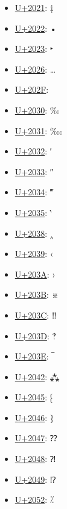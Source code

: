 \begin{itemize}
	\item \href{https://www.compart.com/en/unicode/U+2021}{U+2021}: ‡
	\item \href{https://www.compart.com/en/unicode/U+2022}{U+2022}: •
	\item \href{https://www.compart.com/en/unicode/U+2023}{U+2023}: ‣
	\item \href{https://www.compart.com/en/unicode/U+2026}{U+2026}: …
	\item \href{https://www.compart.com/en/unicode/U+202F}{U+202F}:  
	\item \href{https://www.compart.com/en/unicode/U+2030}{U+2030}: ‰
	\item \href{https://www.compart.com/en/unicode/U+2031}{U+2031}: ‱
	\item \href{https://www.compart.com/en/unicode/U+2032}{U+2032}: ′
	\item \href{https://www.compart.com/en/unicode/U+2033}{U+2033}: ″
	\item \href{https://www.compart.com/en/unicode/U+2034}{U+2034}: ‴
	\item \href{https://www.compart.com/en/unicode/U+2035}{U+2035}: ‵
	\item \href{https://www.compart.com/en/unicode/U+2038}{U+2038}: ‸
	\item \href{https://www.compart.com/en/unicode/U+2039}{U+2039}: ‹
	\item \href{https://www.compart.com/en/unicode/U+203A}{U+203A}: ›
	\item \href{https://www.compart.com/en/unicode/U+203B}{U+203B}: ※
	\item \href{https://www.compart.com/en/unicode/U+203C}{U+203C}: ‼
	\item \href{https://www.compart.com/en/unicode/U+203D}{U+203D}: ‽
	\item \href{https://www.compart.com/en/unicode/U+203E}{U+203E}: ‾
	\item \href{https://www.compart.com/en/unicode/U+2042}{U+2042}: ⁂
	\item \href{https://www.compart.com/en/unicode/U+2045}{U+2045}: ⁅
	\item \href{https://www.compart.com/en/unicode/U+2046}{U+2046}: ⁆
	\item \href{https://www.compart.com/en/unicode/U+2047}{U+2047}: ⁇
	\item \href{https://www.compart.com/en/unicode/U+2048}{U+2048}: ⁈
	\item \href{https://www.compart.com/en/unicode/U+2049}{U+2049}: ⁉
	\item \href{https://www.compart.com/en/unicode/U+2052}{U+2052}: ⁒

\end{itemize}
